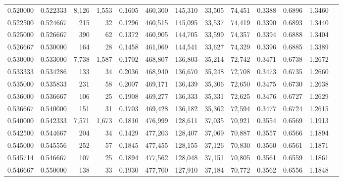\begin{tabular}{rrrrrrrrrrrrr}
0.520000 & 0.522333 &  8,126 & 1,553 &                                     0.1605 & 460,300 & 145,310 &  33,505 &  74,451 & 0.3388 & 0.6896 & 1.3460 \\
0.522500 & 0.524667 &    215 &    32 &                                     0.1296 & 460,515 & 145,095 &  33,537 &  74,419 & 0.3390 & 0.6893 & 1.3440 \\
0.525000 & 0.526667 &    390 &    62 &                                     0.1372 & 460,905 & 144,705 &  33,599 &  74,357 & 0.3394 & 0.6888 & 1.3404 \\
0.526667 & 0.530000 &    164 &    28 &                                     0.1458 & 461,069 & 144,541 &  33,627 &  74,329 & 0.3396 & 0.6885 & 1.3389 \\
0.530000 & 0.533000 &  7,738 & 1,587 &                                     0.1702 & 468,807 & 136,803 &  35,214 &  72,742 & 0.3471 & 0.6738 & 1.2672 \\
0.533333 & 0.534286 &    133 &    34 &                                     0.2036 & 468,940 & 136,670 &  35,248 &  72,708 & 0.3473 & 0.6735 & 1.2660 \\
0.535000 & 0.535833 &    231 &    58 &                                     0.2007 & 469,171 & 136,439 &  35,306 &  72,650 & 0.3475 & 0.6730 & 1.2638 \\
0.536000 & 0.536667 &    106 &    25 &                                     0.1908 & 469,277 & 136,333 &  35,331 &  72,625 & 0.3476 & 0.6727 & 1.2629 \\
0.536667 & 0.540000 &    151 &    31 &                                     0.1703 & 469,428 & 136,182 &  35,362 &  72,594 & 0.3477 & 0.6724 & 1.2615 \\
0.540000 & 0.542333 &  7,571 & 1,673 &                                     0.1810 & 476,999 & 128,611 &  37,035 &  70,921 & 0.3554 & 0.6569 & 1.1913 \\
0.542500 & 0.544667 &    204 &    34 &                                     0.1429 & 477,203 & 128,407 &  37,069 &  70,887 & 0.3557 & 0.6566 & 1.1894 \\
0.545000 & 0.545556 &    252 &    57 &                                     0.1845 & 477,455 & 128,155 &  37,126 &  70,830 & 0.3560 & 0.6561 & 1.1871 \\
0.545714 & 0.546667 &    107 &    25 &                                     0.1894 & 477,562 & 128,048 &  37,151 &  70,805 & 0.3561 & 0.6559 & 1.1861 \\
0.546667 & 0.550000 &    138 &    33 &                                     0.1930 & 477,700 & 127,910 &  37,184 &  70,772 & 0.3562 & 0.6556 & 1.1848 \\

\end{tabular}
